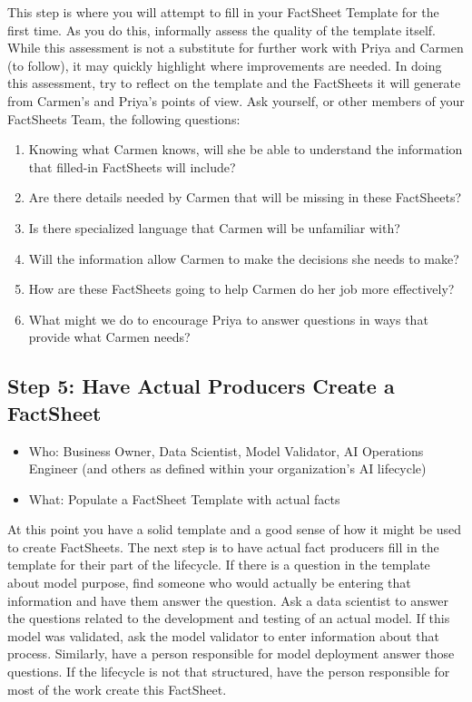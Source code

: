 \documentclass[11pt,dvipdfm]{article}
\begin{document}
This step is where you will attempt to fill in your FactSheet Template for the first time. As you do this, informally assess the quality of the template itself. While this assessment is not a substitute for further work with Priya and Carmen (to follow), it may quickly highlight where improvements are needed. In doing this assessment, try to reflect on the template and the FactSheets it will generate from Carmen's and Priya's points of view. Ask yourself, or other members of your FactSheets Team, the following questions:\\

\begin{enumerate}
\item Knowing what Carmen knows, will she be able to understand the information that filled-in FactSheets will include?
\item Are there details needed by Carmen that will be missing in these FactSheets?
\item Is there specialized language that Carmen will be unfamiliar with?
\item Will the information allow Carmen to make the decisions she needs to make?
\item How are these FactSheets going to help Carmen do her job more effectively?
\item What might we do to encourage Priya to answer questions in ways that provide what Carmen needs?
\end{enumerate}

\subsection{Step 5: Have Actual Producers Create a FactSheet}

\begin{itemize}[noitemsep,nolistsep]
    \item Who: Business Owner, Data Scientist, Model Validator, AI Operations Engineer (and others as defined within your organization's AI lifecycle)
    \item What: Populate a FactSheet Template with actual facts
\end{itemize}
\hspace{.2cm}

At this point you have a solid template and a good sense of how it might be used to create FactSheets. The next step is to have actual fact producers fill in the template for their part of the lifecycle. If there is a question in the template about model purpose, find someone who would actually be entering that information and have them answer the question. Ask a data scientist to answer the questions related to the development and testing of an actual model. If this model was validated, ask the model validator to enter information about that process. 
Similarly, have a person responsible for model deployment answer those questions.
If the lifecycle is not that structured, have the person responsible for most of the work create this FactSheet. 
\end{document}
